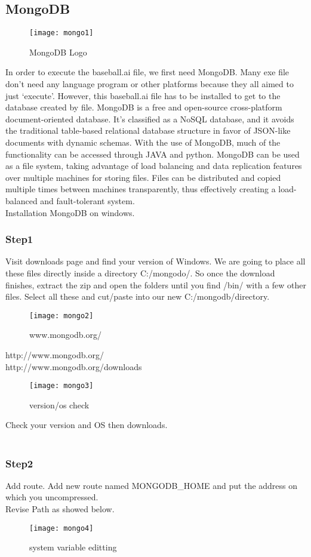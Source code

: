 \documentclass[conference,compsoc, twocolumn]{IEEEtran}
\begin{document}
\begin{itemize}
\subsection{MongoDB}
\begin{figure}[H]
\centering\texttt{[image: mongo1]}
\caption{MongoDB Logo}
\end{figure}
In order to execute the baseball.ai file, we first need MongoDB. Many exe file don’t need any language program or other platforms because they all aimed to just ‘execute’. However, this baseball.ai file has to be installed to get to the database created by file. MongoDB is a free and open-source cross-platform document-oriented database. It’s classified as a NoSQL database, and it avoids the traditional table-based relational database structure in favor of JSON-like documents with dynamic schemas. With the use of MongoDB, much of the functionality can be accessed through JAVA and python. MongoDB can be used as a file system, taking advantage of load balancing and data replication features over multiple machines for storing files. Files can be distributed and copied multiple times between machines transparently, thus effectively creating a load-balanced and fault-tolerant system. \\
Installation MongoDB on windows.\\

\subsubsection{Step1}
Visit downloads page and find your version of Windows. We are going to place all these files directly inside a directory C:/mongodo/. So once the download finishes, extract the zip and open the folders until you find /bin/ with a few other files. Select all these and cut/paste into our new C:/mongodb/directory.
\begin{figure}[H]
\centering\texttt{[image: mongo2]}
\caption{www.mongodb.org/}
\end{figure}
http://www.mongodb.org/ \\
http://www.mongodb.org/downloads\\
\begin{figure}[H]
\centering\texttt{[image: mongo3]}
\caption{version/os check}
\end{figure}
Check your version and OS then downloads.\\ \\


\subsubsection{Step2}
Add route. Add new route named MONGODB\_HOME and put the address on which you uncompressed.\\
Revise Path as showed below.
\begin{figure}[H]
\centering\texttt{[image: mongo4]}
\caption{system variable editting}
\end{figure}


\end{itemize}
\end{document}
